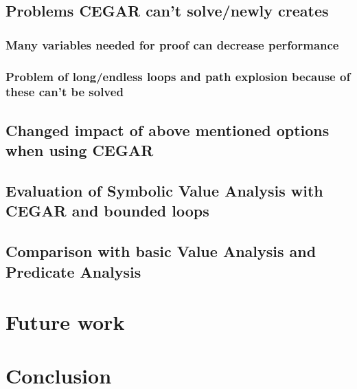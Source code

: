 \documentclass[a4paper,11pt]{article}
\begin{document}
\subsection{Problems CEGAR can't solve/newly creates}
\subsubsection{Many variables needed for proof can decrease performance}
\subsubsection{Problem of long/endless loops and path explosion because of these can't be solved}

\subsection{Changed impact of above mentioned options when using CEGAR}
\subsection{Evaluation of Symbolic Value Analysis with CEGAR and bounded loops}

\subsection{Comparison with basic Value Analysis and Predicate Analysis}

\section{Future work}

\section{Conclusion}
\end{document}
